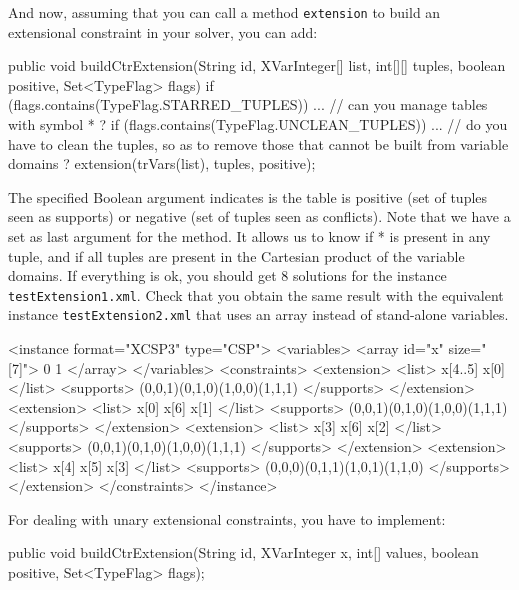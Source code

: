 \documentclass[10pt]{article}
\newenvironment{boxabsc}
               {\medskip \begin{bclogo}[barre=none,arrondi=0.2,logo=]{}\vspace{-0.6cm}}
               {\vspace{-0.1cm}\end{bclogo} \smallskip}
\newcommand{\nn}[1]{{\tt #1}} %
\begin{document}
And now, assuming that you can call a method \nn{extension} to build an extensional constraint in your solver, you can add:
	
\begin{boxabsc}
\begin{absc}
  public void buildCtrExtension(String id, XVarInteger[] list, int[][] tuples, boolean positive, Set<TypeFlag> flags) {
    if (flags.contains(TypeFlag.STARRED_TUPLES)) {
      ... // can you manage tables with symbol * ?
    }
    if (flags.contains(TypeFlag.UNCLEAN_TUPLES)) {
      ... // do you have to clean the tuples, so as to remove those that cannot be built from variable domains ?
    }
    extension(trVars(list), tuples, positive);
  }
\end{absc} 
\end{boxabsc}

The specified Boolean argument indicates is the table is positive (set of tuples seen as supports) or negative (set of tuples seen as conflicts). Note that we have a set as last argument for the method. It allows us to know if * is present in any tuple, and if all tuples are present in the Cartesian product of the variable domains.
If everything is ok, you should get 8 solutions for the instance \nn{testExtension1.xml}.
Check that you obtain the same result with the equivalent instance \nn{testExtension2.xml} that uses an array instead of stand-alone variables.

\begin{boxabsc}
\begin{absc}
<instance format="XCSP3" type="CSP">
  <variables>
    <array id="x" size="[7]"> 0 1 </array>
  </variables>
  <constraints>
    <extension>
      <list> x[4..5] x[0] </list>
      <supports> (0,0,1)(0,1,0)(1,0,0)(1,1,1) </supports>
    </extension>
    <extension>
      <list> x[0] x[6] x[1] </list>
      <supports> (0,0,1)(0,1,0)(1,0,0)(1,1,1) </supports>
    </extension>
    <extension>
      <list> x[3] x[6] x[2] </list>
      <supports> (0,0,1)(0,1,0)(1,0,0)(1,1,1) </supports>
    </extension>
    <extension>
      <list> x[4] x[5] x[3] </list>
      <supports> (0,0,0)(0,1,1)(1,0,1)(1,1,0) </supports>
    </extension>
  </constraints>
</instance>
\end{absc} 
\end{boxabsc}


For dealing with unary extensional constraints, you have to implement:
\begin{boxabsc}
\begin{absc}
public void buildCtrExtension(String id, XVarInteger x, int[] values, boolean positive, Set<TypeFlag> flags);
\end{absc} 
\end{boxabsc}
\end{document}

